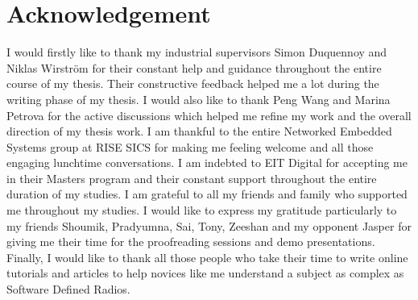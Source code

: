\chapter*{Acknowledgement}

I would firstly like to thank my industrial supervisors Simon Duquennoy and Niklas
Wirström for their constant help and guidance throughout the entire course of my thesis.
Their constructive feedback helped me a lot during the writing phase of my thesis.
I would also like to thank Peng Wang and Marina Petrova for the active discussions which helped me refine my work and the overall direction of my thesis work.
I am thankful to the entire Networked Embedded Systems group at RISE SICS for making me feeling welcome and all those engaging lunchtime conversations.
I am indebted to EIT Digital for accepting me in their Masters program and their constant support throughout the entire duration of my studies.
I am grateful to all my friends and family who supported me throughout my studies.
I would like to express my gratitude particularly to my friends Shoumik, Pradyumna, Sai, Tony, Zeeshan and my opponent Jasper for giving me their time for the proofreading sessions and demo presentations.
Finally, I would like to thank all those people who take their time to write online tutorials and articles to help novices like me understand a subject as complex as Software Defined Radios.